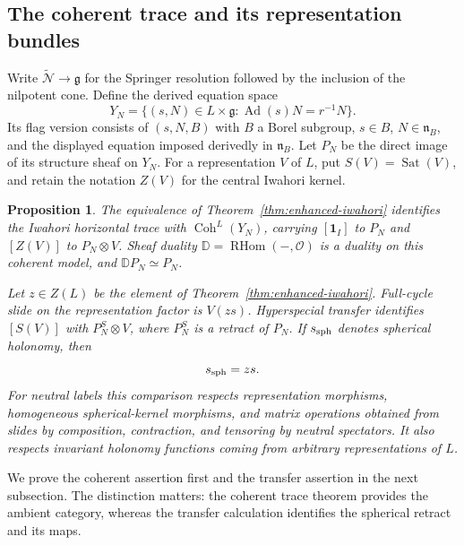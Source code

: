 \documentclass[11pt]{article}
\numberwithin{equation}{section}
\newtheorem{proposition}[theorem]{Proposition}
\theoremstyle{definition}
\theoremstyle{remark}
\newcommand{\g}{\mathfrak g}
\newcommand{\cO}{\mathcal O}
\newcommand{\cN}{\mathcal N}
\newcommand{\Ad}{\operatorname{Ad}}
\newcommand{\RHom}{\operatorname{RHom}}
\newcommand{\Coh}{\operatorname{Coh}}
\newcommand{\Sat}{\operatorname{Sat}}
\begin{document}
\subsection{The coherent trace and its representation bundles}

Write $\widetilde{\cN}\to\g$ for the Springer resolution followed by
the inclusion of the nilpotent cone.  Define the derived equation space
\begin{equation}\label{eq:coherent-trace}
 Y_N=\{(s,N)\in L\times\g:\Ad(s)N=r^{-1}N\}.
\end{equation}
Its flag version consists of $(s,N,B)$ with $B$ a Borel subgroup,
$s\in B$, $N\in\mathfrak n_B$, and the displayed equation imposed
derivedly in $\mathfrak n_B$.  Let $P_N$ be the direct image of its
structure sheaf on $Y_N$.  For a representation $V$ of $L$, put
$S(V)=\Sat(V)$, and retain the notation $Z(V)$ for the central
Iwahori kernel.

\begin{proposition}\label{prop:trace-model}
The equivalence of Theorem~\ref{thm:enhanced-iwahori} identifies the
Iwahori horizontal trace with $\Coh^L(Y_N)$, carrying
$[\mathbf1_I]$ to $P_N$ and $[Z(V)]$ to $P_N\otimes V$.
Sheaf duality $\mathbb D=\RHom(-,\cO)$ is a duality on this coherent
model, and $\mathbb DP_N\simeq P_N$.

Let $z\in Z(L)$ be the element of
Theorem~\ref{thm:enhanced-iwahori}.  Full-cycle slide on the
representation factor is $V(zs)$.  Hyperspecial transfer identifies
$[S(V)]$ with $P_N^S\otimes V$, where $P_N^S$ is a retract of $P_N$.
If $s_{\rm sph}$ denotes spherical holonomy, then
\begin{equation}\label{eq:coordinate-shift}
 s_{\rm sph}=zs.
\end{equation}
For neutral labels this comparison respects representation morphisms,
homogeneous spherical-kernel morphisms, and matrix operations obtained
from slides by composition, contraction, and tensoring by neutral
spectators.  It also respects invariant holonomy functions coming
from arbitrary representations of $L$.
\end{proposition}

We prove the coherent assertion first and the transfer assertion in the
next subsection.  The distinction matters: the coherent trace theorem
provides the ambient category, whereas the transfer calculation
identifies the spherical retract and its maps.
\end{document}
